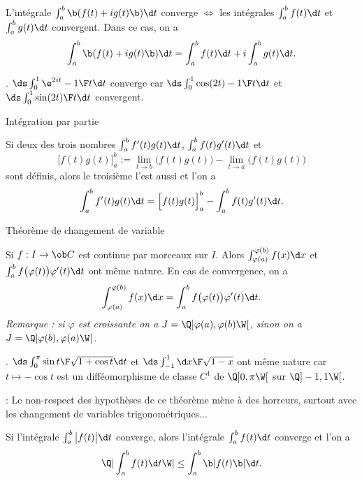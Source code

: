 L'intégrale $\int_a^b\b(f(t)+ig(t)\b)\d t$ converge $\Leftrightarrow$ les intégrales $\int_a^bf(t)\d t$ et $\int_a^bg(t)\d t$ convergent. 
Dans ce cas, on a 
$$
\int_a^b\b(f(t)+ig(t)\b)\d t=\int_a^bf(t)\d t+i\int_a^bg(t)\d t. 
$$

\Exemple. $\ds\int_0^1{\e^{2it}-1\F t}\d t$ converge car $\ds\int_0^1{\cos(2t)-1\F t}\d t$ et $\ds\int_0^1{\sin(2t)\F t}\d t$ convergent. 
\bigskip

\Concept Intégration par partie

Si deux des trois nombres $\int_a^bf'(t)g(t)\d t$, $\int_a^bf(t)g'(t)\d t$ et 
$$
\Big[f(t)g(t)\Big]_a^b:=\lim\limits_{t\to b}\Big(f(t)g(t)\Big)-\lim\limits_{t\to a}\Big(f(t)g(t)\Big)
$$
sont définis, alors le troisième l'est aussi et l'on a 
$$
\int_a^bf'(t)g(t)\d t=\Big[f(t)g(t)\Big]_a^b-\int_a^bf(t)g'(t)\d t. 
$$



\Concept Théorème de changement de variable


Si $f:I\to\ob C$ est continue par morceaux sur $I$. 
Alors $\int_{\varphi(a)}^{\varphi(b)}f(x)\d x$ et $\int_a^bf\big(\varphi(t)\big)\varphi'(t)\d t$ 
ont même nature. En cas de convergence, on a 
$$
\int_{\varphi(a)}^{\varphi(b)}f(x)\d x=\int_a^bf\big(\varphi(t)\big)\varphi'(t)\d t.
$$
{\it Remarque : si $\varphi$ est croissante on a $J=\Q]\varphi(a), \varphi(b)\W[$, sinon on a $J=\Q]\varphi(b),\varphi(a)\W[$. }

\Exemple. $\ds\int_0^\pi{\sin t\F\sqrt{1+\cos t}}\d t$ et $\ds\int_{-1}^1{\d x\F\sqrt{1-x}}$ ont même nature car $t\mapsto -\cos t$ 
est un difféomorphisme de classe $C^1$ de $\Q]0,\pi\W[$ sur $\Q]-1,1\W[$. 
\bigskip

\Remarque : Le non-respect des hypothèses de ce théorème mène à des horreurs, surtout avec les changement de variables trigonométriques... 
\medskip

%

Si l'intégrale $\int_a^b\big|f(t)\big|\d t$ converge, alors l'intégrale $\int_a^bf(t)\d t$ converge et l'on a 
$$
\Q|\int_a^bf(t)\d t\W|\le \int_a^b\b|f(t)\b|\d t. 
$$

